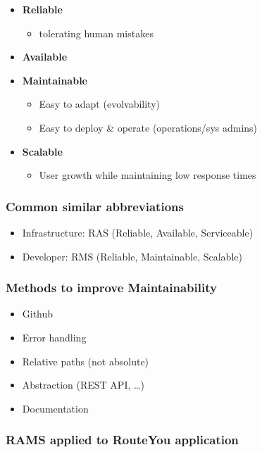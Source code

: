 \documentclass{article}
\begin{document}
\begin{itemize}
    \item \textbf{Reliable}
    \begin{itemize}
        \item tolerating human mistakes
    \end{itemize}
    \item \textbf{Available}
    \item \textbf{Maintainable}
    \begin{itemize}
        \item Easy to adapt (evolvability)
        \item Easy to deploy \& operate (operations/sys admins)
    \end{itemize}
    \item \textbf{Scalable}
    \begin{itemize}
        \item User growth while maintaining low response times
    \end{itemize}
\end{itemize}

\subsubsection{Common similar abbreviations}

\begin{itemize}
    \item Infrastructure: RAS (Reliable, Available, Serviceable)
    \item Developer: RMS (Reliable, Maintainable, Scalable)
\end{itemize}

\subsubsection{Methods to improve Maintainability}

\begin{itemize}
    \item Github
    \item Error handling
    \item Relative paths (not absolute)
    \item Abstraction (REST API, \dots)
    \item Documentation
\end{itemize}

\subsubsection{RAMS applied to RouteYou application}
\end{document}
